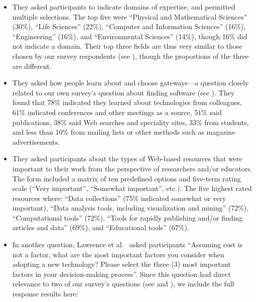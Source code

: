 \documentclass{casicswhitepaper}
\begin{document}
\begin{itemize}

\item They asked participants to indicate domains of expertise, and permitted multiple selections.  The top five were ``Physical and Mathematical Sciences'' (30\%), ``Life Sciences'' (22\%), ``Computer and Information Sciences'' (16\%), ``Engineering'' (16\%), and ``Environmental Sciences'' (14\%), though 16\% did not indicate a domain.  Their top three fields are thus very similar to those chosen by our survey respondents (see ), though the proportions of the three are different.

\item They asked how people learn about and choose gateways---a question closely related to our own survey's question about finding software (see ).  They found that 78\% indicated they learned about technologies from colleagues, 61\% indicated conferences and other meetings as a source, 51\% said publications, 38\% said Web searches and speciality sites, 33\% from students, and less than 10\% from mailing lists or other methods such as magazine advertisements.

\item They asked participants about the types of Web-based resources that were important to their work from the perspective of researchers and/or educators.  The form included a matrix of ten predefined options and five-term rating scale (``Very important'', ``Somewhat important'', etc.).  The five highest rated resources where: ``Data collections'' (75\% indicated somewhat or very important), ``Data analysis tools, including visualization and mining'' (72\%), ``Computational tools'' (72\%), ``Tools for rapidly publishing and/or finding articles and data'' (69\%), and ``Educational tools'' (67\%).

\item In another question, Lawrence et al.~\cite{lawrence2015science} asked participants ``Assuming cost is not a factor, what are the most important factors you consider when adopting a new technology? Please select the three (3) most important factors in your decision-making process''.  Since this question had direct relevance to two of our survey's questions (see  and ), we include the full response results here:


\end{itemize}
\end{document}
